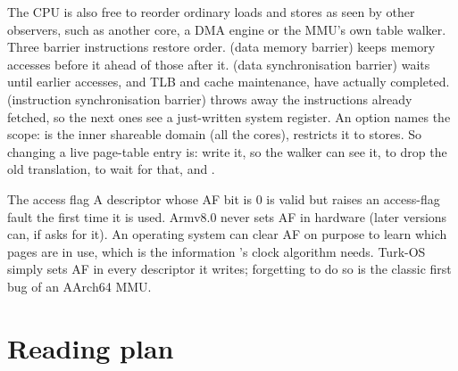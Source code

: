 \documentclass[11pt,a4paper]{article}
\begin{document}
The CPU is also free to reorder ordinary loads and stores as seen by other observers, such as another core, a DMA
engine or the MMU's own table walker. Three barrier instructions restore order.  (data memory barrier)
keeps memory accesses before it ahead of those after it.  (data synchronisation barrier) waits until earlier
accesses, and TLB and cache maintenance, have actually completed.  (instruction synchronisation barrier)
throws away the instructions already fetched, so the next ones see a just-written system register. An option names
the scope:  is the inner shareable domain (all the cores),  restricts it to stores. So changing a
live page-table entry is: write it,  so the walker can see it,  to drop the old
translation,  to wait for that, and .

\begin{conceptbox}{The access flag}
A descriptor whose AF bit is 0 is valid but raises an access-flag fault the first time it is used. Armv8.0 never sets
AF in hardware (later versions can, if  asks for it). An operating system can clear AF on purpose to
learn which pages are in use, which is the information \OSTEP's clock algorithm needs. Turk-OS simply sets AF in every
descriptor it writes; forgetting to do so is the classic first bug of an AArch64 MMU.
\end{conceptbox}

\section{Reading plan}
\end{document}

